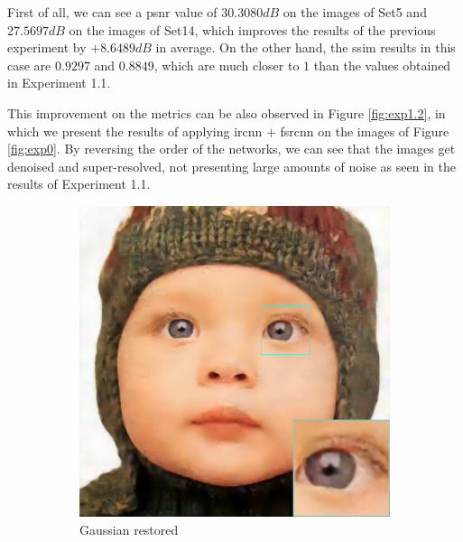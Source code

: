 First of all, we can see a \gls{psnr} value of $30.3080dB$ on the images of Set5 and $27.5697dB$ on the images of Set14, which improves the results of the previous experiment by $+8.6489dB$ in average. On the other hand, the \gls{ssim} results in this case are $0.9297$ and $0.8849$, which are much closer to $1$ than the values obtained in Experiment 1.1.

This improvement on the metrics can be also observed in Figure \ref{fig:exp1.2}, in which we present the results of applying \gls{ircnn} $+$ \gls{fsrcnn} on the images of Figure \ref{fig:exp0}. By reversing the order of the networks, we can see that the images get denoised and super-resolved, not presenting large amounts of noise as seen in the results of Experiment 1.1.

\begin{figure}
	\centering
	\begin{subfigure}{0.24\textwidth}
		\includegraphics[width=\textwidth]{images/exp1.2/gaussian.png}
		\caption{Gaussian restored}
	\end{subfigure}
	\begin{subfigure}{0.24\textwidth}

\end{subfigure}
\end{figure}
